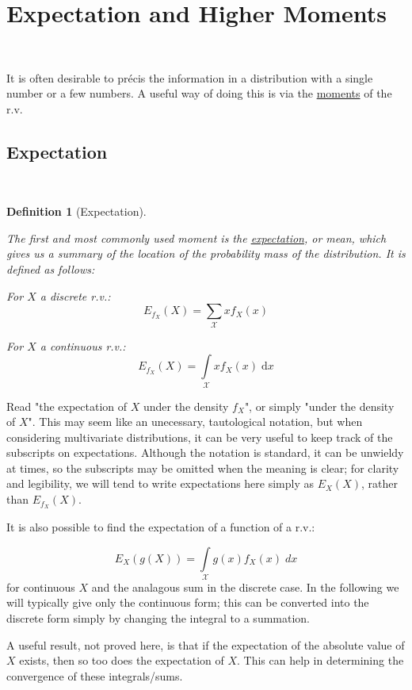 \documentclass[12pt,a4paper]{article}
\newtheorem{defn}[thm]{Definition}
\begin{document}
\clearpage
\section{Expectation and Higher Moments}$\;$

It is often desirable to pr\'ecis the information in a distribution with a single number or a few numbers. A useful way of doing this is via the \underline{moments} of the r.v.

\subsection{Expectation}$\;$

\begin{defn}[Expectation]$\;$\par
\vspace{1cm}

The first and most commonly used moment is the \underline{expectation}, or mean, which gives us a summary of the location of the probability mass of the distribution. It is defined as follows:\par
\vspace{1cm}
\noindent For $X$ a discrete r.v.:
$$E_{f_X}(X) = \sum_{\mathcal{X}}x f_X(x)$$

\noindent For $X$ a continuous r.v.:
$$E_{f_X}(X) = \int\limits_{\mathcal{X}} x f_X(x)\; \mathrm{d}x$$

\end{defn}

Read "the expectation of $X$ under the density $f_X$", or simply "under the density of $X$". This may seem like an unecessary, tautological notation, but when considering multivariate distributions, it can be very useful to keep track of the subscripts on expectations. Although the notation is standard, it can be unwieldy at times, so the subscripts may be omitted when the meaning is clear; for clarity and legibility, we will tend to write expectations here simply as $E_X(X)$, rather than $E_{f_X}(X)$.

It is also possible to find the expectation of a function of a r.v.:

$$E_{X}(g(X)) = \int\limits_{\mathcal{X}} \!\!g(x) f_X(x)\; dx$$
for continuous $X$ and the analagous sum in the discrete case. In the following we will typically give only the continuous form; this can be converted into the discrete form simply by changing the integral to a summation.

A useful result, not proved here, is that if the expectation of the absolute value of $X$ exists, then so too does the expectation of $X$. This can help in determining the convergence of these integrals/sums.
\end{document}
